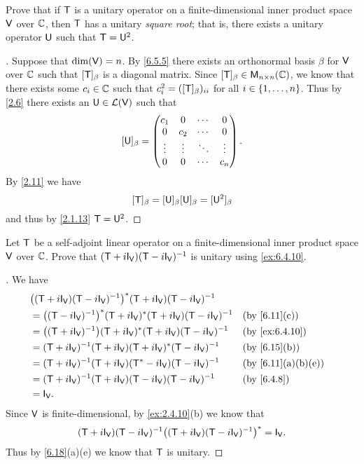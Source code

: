 \begin{ex}\label{ex:6.5.7}
  Prove that if \(\mathsf{T}\) is a unitary operator on a finite-dimensional inner product space \(\mathsf{V}\) over \(\mathbb{C}\), then \(\mathsf{T}\) has a unitary \emph{square root};
  that is, there exists a unitary operator \(\mathsf{U}\) such that \(\mathsf{T} = \mathsf{U}^2\).
\end{ex}

\begin{proof}[]
  Suppose that \(\dim(\mathsf{V}) = n\).
  By \cref{6.5.5} there exists an orthonormal basis \(\beta\) for \(\mathsf{V}\) over \(\mathbb{C}\) such that \([\mathsf{T}]_{\beta}\) is a diagonal matrix.
  Since \([\T]_{\beta} \in \ms[n][n][\C]\), we know that there exists some \(c_i \in \mathbb{C}\) such that \(c_i^2 = ([\mathsf{T}]_{\beta})_{i i}\) for all \(i \in \left\lbrace1, \dots, n\right\rbrace\).
  Thus by \cref{2.6} there exists an \(\mathsf{U} \in \mathcal{L}(\mathsf{V})\) such that
  \[
    [\mathsf{U}]_{\beta} = \begin{pmatrix}
      c_1    & 0      & \cdots & 0      \\
      0      & c_2    & \cdots & 0      \\
      \vdots & \vdots & \ddots & \vdots \\
      0      & 0      & \cdots & c_n
    \end{pmatrix}.
  \]
  By \cref{2.11} we have
  \[
    [\mathsf{T}]_{\beta} = [\mathsf{U}]_{\beta} [\mathsf{U}]_{\beta} = [\mathsf{U}^2]_{\beta}
  \]
  and thus by \cref{2.1.13} \(\mathsf{T} = \mathsf{U}^2\).
\end{proof}

\begin{ex}\label{ex:6.5.8}
  Let \(\mathsf{T}\) be a self-adjoint linear operator on a finite-dimensional inner product space \(\mathsf{V}\) over \(\mathbb{C}\).
  Prove that \((\T + i \IT[\V])(\T - i \IT[\V])^{-1}\) is unitary using \cref{ex:6.4.10}.
\end{ex}

\begin{proof}[]
  We have
  \begin{align*}
     & \pa{(\T + i \IT[\V]) (\T - i \IT[\V])^{-1}}^* (\T + i \IT[\V]) (\T - i \IT[\V])^{-1}                           \\
     & = \pa{(\T - i \IT[\V])^{-1}}^* (\T + i \IT[\V])^* (\T + i \IT[\V]) (\T - i \IT[\V])^{-1} &  & \by{6.11}[c]     \\
     & = \pa{(\T + i \IT[\V])^{-1}} (\T + i \IT[\V])^* (\T + i \IT[\V]) (\T - i \IT[\V])^{-1}   &  & \by{ex:6.4.10}   \\
     & = (\T + i \IT[\V])^{-1} (\T + i \IT[\V]) (\T + i \IT[\V])^* (\T - i \IT[\V])^{-1}        &  & \by{6.15}[b]     \\
     & = (\T + i \IT[\V])^{-1} (\T + i \IT[\V]) (\T^* - i \IT[\V]) (\T - i \IT[\V])^{-1}        &  & \by{6.11}[a,b,e] \\
     & = (\T + i \IT[\V])^{-1} (\T + i \IT[\V]) (\T - i \IT[\V]) (\T - i \IT[\V])^{-1}          &  & \by{6.4.8}       \\
     & = \IT[\V].
  \end{align*}
  Since \(\mathsf{V}\) is finite-dimensional, by \cref{ex:2.4.10}(b) we know that
  \[
    (\T + i \IT[\V]) (\T - i \IT[\V])^{-1} \pa{(\T + i \IT[\V]) (\T - i \IT[\V])^{-1}}^* = \IT[\V].
  \]
  Thus by \cref{6.18}(a)(e) we know that \(\mathsf{T}\) is unitary.
\end{proof}

